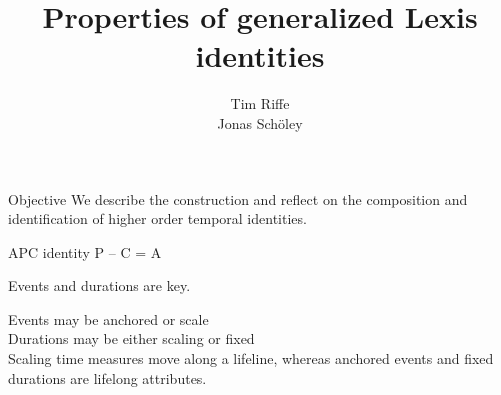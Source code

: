 \documentclass[20pt]{beamer}
\title{Properties of generalized Lexis identities}
\subtitle{Tim Riffe \\ Jonas Sch{\"o}ley}		%
\begin{document}

\begin{frame}
	\titlepage
\end{frame}
\begin{frame}[plain]
\begin{block}{Objective}
We describe the construction and reflect on the composition and identification
of higher order temporal identities.
\end{block}

\end{frame}


\begin{frame}[plain]
\end{frame}


\begin{frame}[plain]
\end{frame}


\begin{frame}[plain]
\begin{block}{APC identity}
P -- C = A
\end{block}
\end{frame}


\begin{frame}[plain]
\Large
Events and durations are key.
\end{frame}


\begin{frame}[plain]
\Large
Events may be anchored or scale\\
Durations may be either scaling or fixed\\
Scaling time measures move along a lifeline, whereas anchored events and fixed
durations are lifelong attributes.
\end{frame}



\begin{frame}[plain]
\begin{center}
\end{center}
\end{frame}
\end{document}
